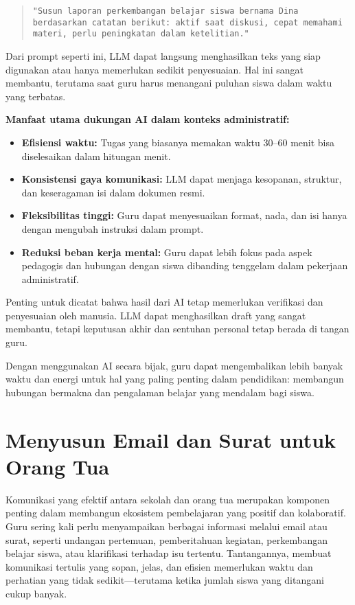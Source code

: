 \begin{quote}
	\centering
	\texttt{"Susun laporan perkembangan belajar siswa bernama Dina berdasarkan catatan berikut: aktif saat diskusi, cepat memahami materi, perlu peningkatan dalam ketelitian."}
\end{quote}

Dari prompt seperti ini, LLM dapat langsung menghasilkan teks yang siap digunakan atau hanya memerlukan sedikit penyesuaian. Hal ini sangat membantu, terutama saat guru harus menangani puluhan siswa dalam waktu yang terbatas.

\textbf{Manfaat utama dukungan AI dalam konteks administratif:}
\begin{itemize}
	\item \textbf{Efisiensi waktu:} Tugas yang biasanya memakan waktu 30–60 menit bisa diselesaikan dalam hitungan menit.
	\item \textbf{Konsistensi gaya komunikasi:} LLM dapat menjaga kesopanan, struktur, dan keseragaman isi dalam dokumen resmi.
	\item \textbf{Fleksibilitas tinggi:} Guru dapat menyesuaikan format, nada, dan isi hanya dengan mengubah instruksi dalam prompt.
	\item \textbf{Reduksi beban kerja mental:} Guru dapat lebih fokus pada aspek pedagogis dan hubungan dengan siswa dibanding tenggelam dalam pekerjaan administratif.
\end{itemize}

Penting untuk dicatat bahwa hasil dari AI tetap memerlukan verifikasi dan penyesuaian oleh manusia. LLM dapat menghasilkan draft yang sangat membantu, tetapi keputusan akhir dan sentuhan personal tetap berada di tangan guru.

Dengan menggunakan AI secara bijak, guru dapat mengembalikan lebih banyak waktu dan energi untuk hal yang paling penting dalam pendidikan: membangun hubungan bermakna dan pengalaman belajar yang mendalam bagi siswa.


\section{Menyusun Email dan Surat untuk Orang Tua}

Komunikasi yang efektif antara sekolah dan orang tua merupakan komponen penting dalam membangun ekosistem pembelajaran yang positif dan kolaboratif. Guru sering kali perlu menyampaikan berbagai informasi melalui email atau surat, seperti undangan pertemuan, pemberitahuan kegiatan, perkembangan belajar siswa, atau klarifikasi terhadap isu tertentu. Tantangannya, membuat komunikasi tertulis yang sopan, jelas, dan efisien memerlukan waktu dan perhatian yang tidak sedikit—terutama ketika jumlah siswa yang ditangani cukup banyak.

